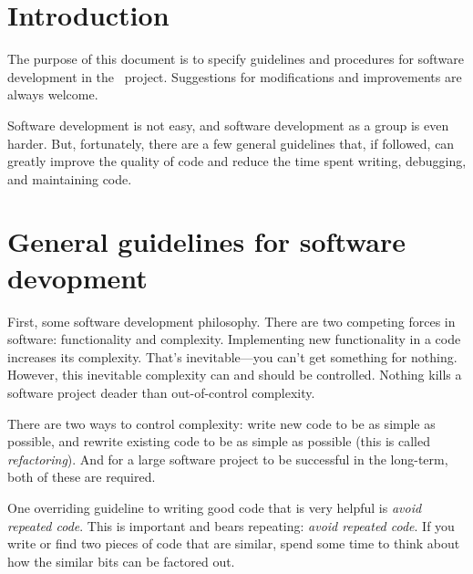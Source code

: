 \documentclass{article}
\begin{document}

\tableofcontents

\section{Introduction} \label{s:intro}

The purpose of this document is to specify guidelines and procedures
for software development in the \cello\ project.  Suggestions for
modifications and improvements are always welcome.

Software development is not easy, and software development as a group
is even harder.  But, fortunately, there are a few general guidelines
that, if followed, can greatly improve the quality of code and reduce
the time spent writing, debugging, and maintaining code.

\section{General guidelines for software devopment}

First, some software development philosophy.  There are two competing
forces in software: functionality and complexity.  Implementing new
functionality in a code increases its complexity.  That's
inevitable---you can't get something for nothing.  However, this
inevitable complexity can and should be controlled.  Nothing kills a
software project deader than out-of-control complexity.

There are two ways to control complexity: write new code to be as
simple as possible, and rewrite existing code to be as simple as
possible (this is called \textit{refactoring}).  And for a large
software project to be successful in the long-term, both of these are
required.

One overriding guideline to writing good code that is very helpful is
\textit{avoid repeated code}.  This is important and bears repeating:
\textit{avoid repeated code}.  If you write or find two pieces of
code that are similar, spend some time to think about how the similar
bits can be factored out.  
\end{document}
